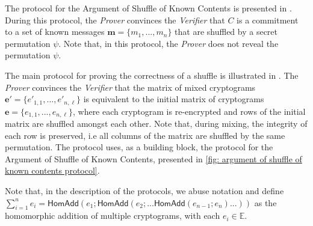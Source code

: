The protocol for the Argument of Shuffle of Known Contents is presented in . During this protocol, the \textit{Prover} convinces the \textit{Verifier} that $C$ is a commitment to a set of known messages $\boldsymbol{m} = \{m_1, ..., m_n\}$ that are shuffled by a secret permutation $\psi$. Note that, in this protocol, the \textit{Prover} does not reveal the permutation $\psi$.

The main protocol for proving the correctness of a shuffle is illustrated in . The \textit{Prover} convinces the \textit{Verifier} that the matrix of mixed cryptograms $\boldsymbol{e'} = \{e'_{1,1}, ..., e'_{n,\ell}\}$ is equivalent to the initial matrix of cryptograms $\boldsymbol{e} = \{e_{1,1}, ..., e_{n,\ell}\}$, where each cryptogram is re-encrypted and rows of the initial matrix are shuffled amongst each other. Note that, during mixing, the integrity of each row is preserved, i.e all columns of the matrix are shuffled by the same permutation. The protocol uses, as a building block, the protocol for the Argument of Shuffle of Known Contents, presented in \cref{fig: argument of shuffle of known contents protocol}.

Note that, in the description of the protocols, we abuse notation and define $\sum_{i=1}^n e_i = \mathsf{HomAdd}(e_1; \mathsf{HomAdd}(e_2; ... \mathsf{HomAdd}(e_{n-1}; e_n) ... ))$ as the homomorphic addition of multiple cryptograms, with each $e_i \in \mathbb{E}$.

